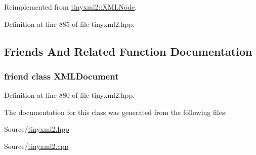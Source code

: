 Reimplemented from \hyperlink{classtinyxml2_1_1_x_m_l_node_a157ce3a00ea5ee5a85b7103138e85e8a}{tinyxml2\-::\-X\-M\-L\-Node}.



Definition at line 885 of file tinyxml2.\-hpp.



\subsection{Friends And Related Function Documentation}
\hypertarget{classtinyxml2_1_1_x_m_l_comment_a4eee3bda60c60a30e4e8cd4ea91c4c6e}{
\subsubsection[{X\-M\-L\-Document}]{\setlength{\rightskip}{0pt plus 5cm}friend class {\bf X\-M\-L\-Document}\hspace{0.3cm}{\ttfamily [friend]}}}\label{classtinyxml2_1_1_x_m_l_comment_a4eee3bda60c60a30e4e8cd4ea91c4c6e}


Definition at line 880 of file tinyxml2.\-hpp.



The documentation for this class was generated from the following files\-:\begin{DoxyCompactItemize}
\item 
Source/\hyperlink{tinyxml2_8hpp}{tinyxml2.\-hpp}\item 
Source/\hyperlink{tinyxml2_8cpp}{tinyxml2.\-cpp}\end{DoxyCompactItemize}
